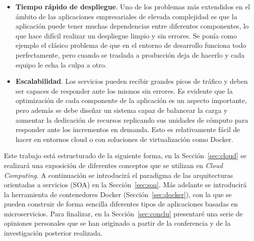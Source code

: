 \begin{itemize}
\begin{figure}
\caption{\label{fig:zerodt}Esquema de recuperación ante fallos.}
\end{figure}
Cómo se puede observar en la Figura~\ref{fig:zerodt}, cuando el servidor físico A falla, se desencadena una migración del contenedor virtual al servidor B. Lo que debería ocurrir sin complicaciones en caso de que el volumen de datos compartido por red siga disponible y solo haya ocurrido un problema aislado en la máquina A. En general, el demonio encargado de vigilar el correcto funcionamiento de los nodos se denomina \textit{watchdog} y su funcionamiento se basa en el intercambio periódico de mensajes con los nodos del cluster para intercambiar información del estado del servicio (\textit{keepalive o hearbeat}).
\item \textbf{Tiempo rápido de despliegue}. Uno de los problemas más extendidos en el ámbito de las aplicaciones empresariales de elevada complejidad es que la aplicación puede tener muchas dependencias entre diferentes componentes, lo que hace difícil realizar un despliegue limpio y sin errores. Se ponía como ejemplo el clásico problema de que en el entorno de desarrollo funciona todo perfectamente, pero cuando se traslada a producción deja de hacerlo y cada equipo le echa la culpa a otro.
\item \textbf{Escalabilidad}. Los servicios pueden recibir grandes picos de tráfico y deben ser capaces de responder ante los mismos sin errores. Es evidente que la optimización de cada componente de la aplicación es un aspecto importante, pero además se debe diseñar un sistema capaz de balancear la carga y aumentar la dedicación de recursos replicando sus unidades de cómputo para responder ante los incrementos en demanda. Esto es relativamente fácil de hacer en entornos cloud o con soluciones de virtualización como Docker.
\end{itemize}

Este trabajo está estructurado de la siguiente forma, en la Sección~\ref{sec:cloud} se realizará una exposición de diferentes conceptos que se utilizan en \emph{Cloud Computing}. A continuación se introducirá el paradigma de las arquitecturas orientadas a servicios (SOA) en la Sección~\ref{sec:soa}. Más adelante se introducirá la herramienta de contenedores Docker (Sección~\ref{sec:docker}), con la que se pueden construir de forma sencilla diferentes tipos de aplicaciones basadas en microservicios. Para finalizar, en la Sección~\ref{sec:conclu} presentaré una serie de opiniones personales que se han originado a partir de la conferencia y de la investigación posterior realizada.

